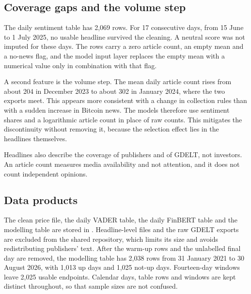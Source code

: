 \subsection{Coverage gaps and the volume step}
The daily sentiment table has 2,069 rows. For 17 consecutive days, from 15 June to 1 July 2025, no usable headline survived the cleaning. A neutral score was not imputed for these days. The rows carry a zero article count, an empty mean and a no-news flag, and the model input layer replaces the empty mean with a numerical value only in combination with that flag.


A second feature is the volume step. The mean daily article count rises from about 204 in December 2023 to about 302 in January 2024, where the two exports meet. This appears more consistent with a change in collection rules than with a sudden increase in Bitcoin news. The models therefore use sentiment shares and a logarithmic article count in place of raw counts. This mitigates the discontinuity without removing it, because the selection effect lies in the headlines themselves.

Headlines also describe the coverage of publishers and of GDELT, not investors. An article count measures media availability and not attention, and it does not count independent opinions.

\subsection{Data products}
The clean price file, the daily VADER table, the daily FinBERT table and the modelling table are stored in . Headline-level files and the raw GDELT exports are excluded from the shared repository, which limits its size and avoids redistributing publishers' text. After the warm-up rows and the unlabelled final day are removed, the modelling table has 2,038 rows from 31 January 2021 to 30 August 2026, with 1,013 up days and 1,025 not-up days. Fourteen-day windows leave 2,025 usable endpoints. Calendar days, table rows and windows are kept distinct throughout, so that sample sizes are not confused.
